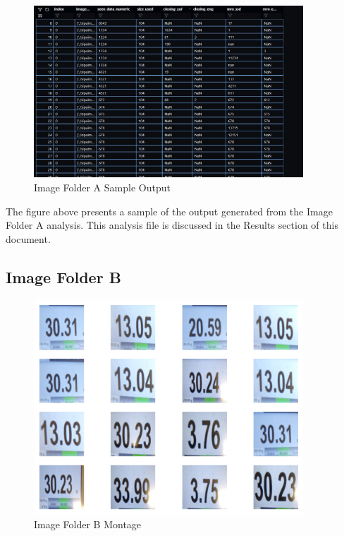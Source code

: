 \begin{figure}[ht]
    \centering
    \includegraphics[width=0.9\textwidth]{Figures/Methodology/sipa_02/sample_output.jpg}
    \caption[Image Folder A Sample Output]{Image Folder A Sample Output}
    \label{fig:Image Folder A Sample Output}
\end{figure}

The figure above presents a sample of the output generated from the Image Folder A analysis. This analysis file is discussed in the Results section of this document.

\newpage
\subsection{Image Folder B}

\begin{figure}[ht]
    \centering
    \includegraphics[width=0.9\textwidth]{Figures/EDA_Charts/3/montage.png}
    \caption[Image Folder B Montage]{Image Folder B Montage}
    \label{fig:Image Folder B Montage}
\end{figure}

